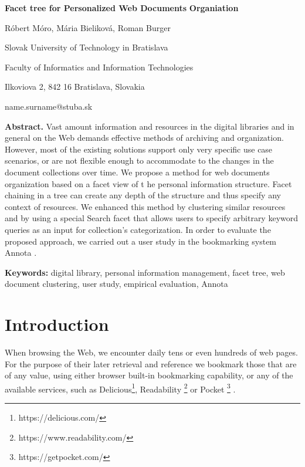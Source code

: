 \documentclass[12pt]{article}
\begin{document}
\begin{center}
 \Large{\textbf{ Facet tree for Personalized Web Documents}}
 \Large{\textbf{Organiation}}
 
 
        \begin{center}
                R\'{o}bert M\'{o}ro, M\'{a}ria Bielikov\'{a}, Roman Burger 
        \end{center}
        \begin{center}
 
                Slovak University of Technology in Bratislava

                Faculty of Informatics and Information Technologies
 
                Ilkoviova 2, 842 16 Bratislava, Slovakia 
  
                name.surname@stuba.sk
        \end{center}
        \end{center}
        
        
    \textbf{Abstract.} Vast amount information and resources in the digital libraries and in general on the Web demands effective methods of archiving and organization. However, most of the existing solutions support only very specific use case scenarios, or are not flexible enough to accommodate to the changes in the document collections over time. We propose a method for web documents organization based on a facet view of t he personal information structure. Facet chaining in a tree can create any depth of the structure and thus specify any context of resources. We enhanced this method by clustering similar resources and by using a special Search facet that allows users to specify arbitrary keyword queries as an input for collection’s categorization. In order to evaluate the proposed approach, we carried out a user study in the bookmarking system Annota .
 
    \textbf {Keywords:} digital library, personal information management, facet tree, web document clustering, user study, empirical evaluation, Annota 

\section {Introduction}
 
 When browsing the Web, we encounter daily tens or even hundreds of web pages. For the purpose of their later retrieval and reference we bookmark those that are of any value, using either browser built-in bookmarking capability, or any of the available services, such as Delicious\footnote{https://delicious.com/}, Readability \footnote{https://www.readability.com/ } or Pocket \footnote{https://getpocket.com/ } . 
\end{document}
